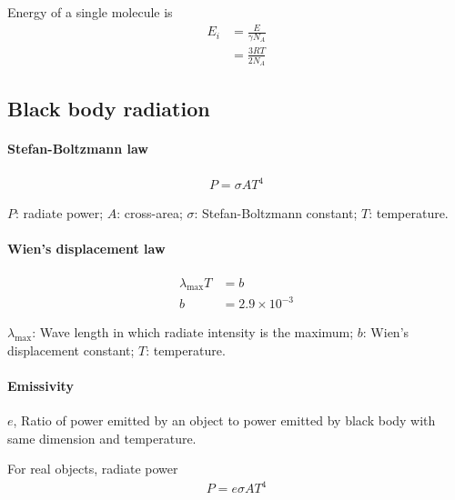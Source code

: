             Energy of a single molecule is
            \begin{align}
                E_i &= \frac{E}{\gamma N_A} \\
                    &= \frac{3 R T}{2 N_A}
            \end{align}

    \subsection{Black body radiation}
        \paragraph{Stefan-Boltzmann law}
            \begin{align}
                P = \sigma A T^4
            \end{align}

            $P$: radiate power; $A$: cross-area; $\sigma$: Stefan-Boltzmann constant; $T$: temperature.

        \paragraph{Wien's displacement law}
            \begin{align}
                \lambda_{\mathrm{max}} T &= b \\
                                       b &= 2.9 \times 10^{-3}
            \end{align}

            $\lambda_{\mathrm{max}}$: Wave length in which radiate intensity is the maximum; $b$: Wien's displacement constant; $T$: temperature.

        \paragraph{Emissivity}
            $e$, Ratio of power emitted by an object to power emitted by black body with same dimension and temperature.

            For real objects, radiate power
            \begin{align}
                P = e \sigma A T^4
            \end{align}